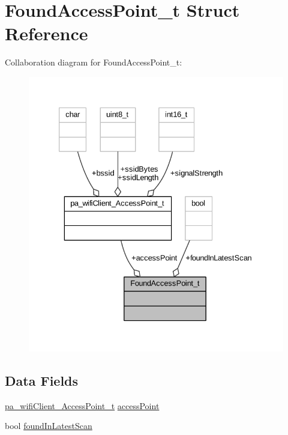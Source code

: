 \hypertarget{struct_found_access_point__t}{}\section{Found\+Access\+Point\+\_\+t Struct Reference}
\label{struct_found_access_point__t}


Collaboration diagram for Found\+Access\+Point\+\_\+t\+:
\nopagebreak
\begin{figure}[H]
\begin{center}
\leavevmode
\includegraphics[width=333pt]{struct_found_access_point__t__coll__graph}
\end{center}
\end{figure}
\subsection*{Data Fields}
\begin{DoxyCompactItemize}
\item 
\hyperlink{structpa__wifi_client___access_point__t}{pa\+\_\+wifi\+Client\+\_\+\+Access\+Point\+\_\+t} \hyperlink{struct_found_access_point__t_a6b7363e0df47de7ec88139bffe116017}{access\+Point}
\item 
bool \hyperlink{struct_found_access_point__t_ab74cb84574b745e080e22aec18a4860d}{found\+In\+Latest\+Scan}
\end{DoxyCompactItemize}


